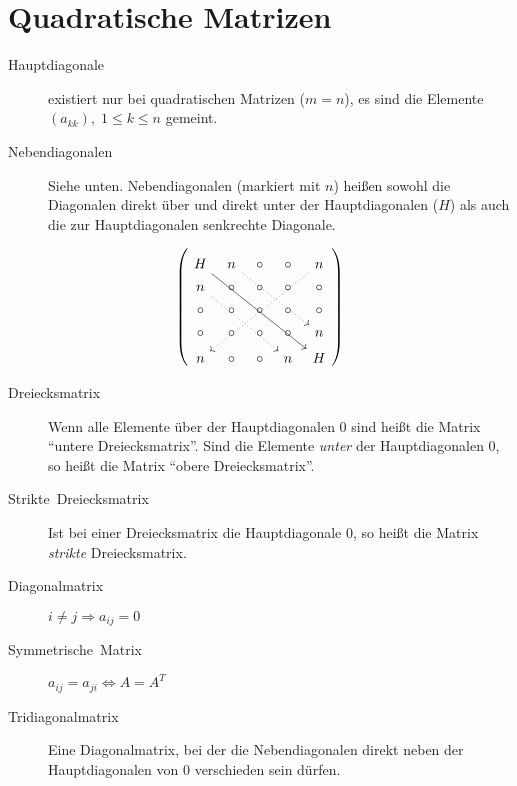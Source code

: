 \section{Quadratische Matrizen}
\begin{description}
  \item [{Hauptdiagonale}] 
	existiert nur bei quadratischen Matrizen ($m=n$), es sind die Elemente $(a_{kk}),\; 1\leq k\leq n$ gemeint.
  \item [{Nebendiagonalen}] 
	Siehe unten.
	Nebendiagonalen (markiert mit $n$) heißen sowohl die Diagonalen direkt über und direkt unter der Hauptdiagonalen ($H$) als auch die zur Hauptdiagonalen senkrechte Diagonale.
\end{description}
\[
  \left(
\begin{tikzcd}[sep=tiny]
        H\arrow{ddddrrrr}                   & n\arrow[dotted, rightarrow]{dddrrr} & \circ & \circ & n\arrow[dotted, rightarrow]{ddddllll} \\
        n\arrow[dotted, rightarrow]{dddrrr} & \circ                               & \circ & \circ & \circ               \\
        \circ                               & \circ                               & \circ & \circ & \circ               \\
        \circ                               & \circ                               & \circ & \circ & n                   \\
        n                                   & \circ                               & \circ & n     & H
\end{tikzcd}
\right)
\]

\begin{description}
  \item [{Dreiecksmatrix}] 
	Wenn alle Elemente über der Hauptdiagonalen 0 sind heißt die Matrix \enquote{untere Dreiecksmatrix}.
	Sind die Elemente \emph{unter} der Hauptdiagonalen 0, so heißt die Matrix \enquote{obere Dreiecksmatrix}.
  \item [{Strikte~Dreiecksmatrix}] 
	Ist bei einer Dreiecksmatrix die Hauptdiagonale 0, so heißt die Matrix \emph{strikte} Dreiecksmatrix.
  \item [{Diagonalmatrix}] 
	$i\neq j\Rightarrow a_{ij}=0$
  \item [{Symmetrische~Matrix}] 
	$a_{ij}=a_{ji} \iff A=A^{T}$
  \item [{Tridiagonalmatrix}] 
    Eine Diagonalmatrix, bei der die Nebendiagonalen direkt neben der Hauptdiagonalen von 0 verschieden sein dürfen.
\end{description}

